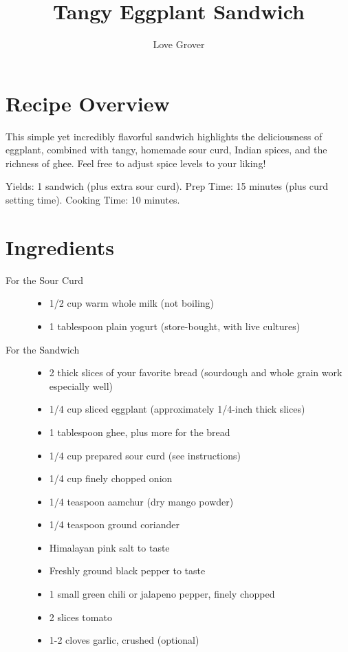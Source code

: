 \documentclass{article} %
\title{Tangy Eggplant Sandwich}
\author{Love Grover}
\date{}
\begin{document}
\maketitle

\section*{Recipe Overview}
This simple yet incredibly flavorful sandwich highlights the deliciousness of eggplant, combined with tangy, homemade sour curd, Indian spices, and the richness of ghee.  Feel free to adjust spice levels to your liking!  

Yields: 1 sandwich (plus extra sour curd).
Prep Time: 15 minutes (plus curd setting time).
Cooking Time: 10 minutes.

\section*{Ingredients}

\begin{description}
\item[For the Sour Curd] \hfill

\begin{itemize}
\item 1/2 cup warm whole milk (not boiling)
\item 1 tablespoon plain yogurt (store-bought, with live cultures)
\end{itemize}

\item[For the Sandwich]\hfill

\begin{itemize}
\item 2 thick slices of your favorite bread (sourdough and whole grain work especially well)
\item 1/4 cup sliced eggplant  (approximately 1/4-inch thick slices)
\item 1 tablespoon ghee, plus more for the bread
\item 1/4 cup prepared sour curd (see instructions)
\item 1/4 cup finely chopped onion
\item 1/4 teaspoon aamchur (dry mango powder)
\item 1/4 teaspoon ground coriander
\item Himalayan pink salt to taste
\item Freshly ground black pepper to taste
\item 1 small green chili or jalapeno pepper, finely chopped
\item 2 slices tomato
\item 1-2 cloves garlic, crushed (optional)
\end{itemize}
\end{description}
\end{document}
